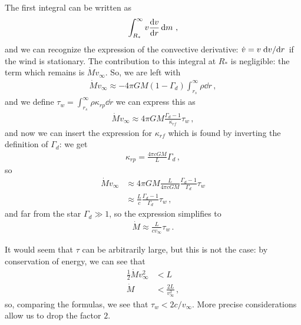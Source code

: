 \documentclass[main.tex]{subfiles}
\begin{document}
\begin{bluebox}
The first integral can be written as 
%
\begin{align}
\int_{R_*}^{ \infty } v \dv{v}{r} \dd{m}
\,,
\end{align}
%
and we can recognize the expression of the convective derivative: \(\dot{v}  = v \dv*{v}{r}\) if the wind is stationary. The contribution to this integral at \(R_*\) is negligible: the term which remains is \(\dot{M} v_{ \infty }\). So, we are left with 
%
\begin{align}
\dot{M} v_{ \infty } \approx - 4 \pi  GM (1- \Gamma_{d}) \int_{r_s}^{ \infty }
\rho \dd{r}
\,,
\end{align}
%
and we define \(\tau_{w} = \int_{r_s}^{ \infty } \rho \kappa_{rp} \dd{r}\) we can express this as 
%
\begin{align}
\dot{M} v_{ \infty } \approx 4 \pi GM \frac{\Gamma_{d} -1 }{\kappa_{rf}} \tau_{w}
\,,
\end{align}
%
and now we can insert the expression for \(\kappa_{rf}\) which is found by inverting the definition of \(\Gamma_{d}\): we get 
%
\begin{align}
\kappa_{rp} = \frac{4 \pi c GM }{L} \Gamma_{d}
\,,
\end{align}
%
so 
%
\begin{subequations}
\begin{align}
\dot{M} v_{ \infty } &\approx 4 \pi  GM \frac{L}{4 \pi c GM} \frac{\Gamma_{d} - 1}{\Gamma_{d}} \tau_{w}  \\
&\approx \frac{L}{c} \frac{\Gamma_{d} - 1}{\Gamma_{d}} \tau_{w}
\,,
\end{align}
\end{subequations}
%
and far from the star \(\Gamma_{d} \gg 1\), so the expression simplifies to 
%
\begin{align}
\dot{M} \approx \frac{L}{c v_{ \infty }}\tau_{w}
\,.
\end{align}

It would seem that \(\tau \) can be arbitrarily large, but this is not the case: by conservation of energy, we can see that 
%
\begin{subequations}
\begin{align}
\frac{1}{2} \dot{M} v_{ \infty }^2 &< L  \\
\dot{M} &< \frac{2L}{v_{ \infty }^2}
\,,
\end{align}
\end{subequations}
%
so, comparing the formulas, we see that \(\tau_{w} < 2 c / v_{ \infty }\). 
More precise considerations allow us to drop the factor \(2\). 
\end{bluebox}
\end{document}
